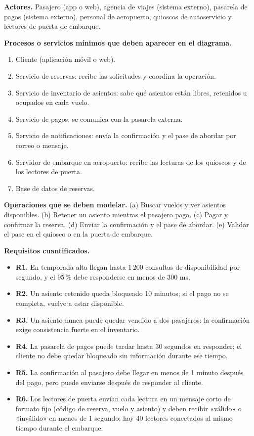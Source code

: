 \documentclass[10pt]{article}
\begin{document}
\textbf{Actores.} Pasajero (app o web), agencia de viajes (sistema externo), pasarela de pagos (sistema externo), personal de aeropuerto, quioscos de autoservicio y lectores de puerta de embarque.

\textbf{Procesos o servicios mínimos que deben aparecer en el diagrama.}
\begin{enumerate}[leftmargin=1.6em]
	\item Cliente (aplicación móvil o web).
	\item Servicio de reservas: recibe las solicitudes y coordina la operación.
	\item Servicio de inventario de asientos: sabe qué asientos están libres, retenidos u ocupados en cada vuelo.
	\item Servicio de pagos: se comunica con la pasarela externa.
	\item Servicio de notificaciones: envía la confirmación y el pase de abordar por correo o mensaje.
	\item Servidor de embarque en aeropuerto: recibe las lecturas de los quioscos y de los lectores de puerta.
	\item Base de datos de reservas.
\end{enumerate}

\textbf{Operaciones que se deben modelar.} (a) Buscar vuelos y ver asientos disponibles. (b) Retener un asiento mientras el pasajero paga. (c) Pagar y confirmar la reserva. (d) Enviar la confirmación y el pase de abordar. (e) Validar el pase en el quiosco o en la puerta de embarque.

\textbf{Requisitos cuantificados.}
\begin{itemize}[leftmargin=1.6em]
	\item \textbf{R1.} En temporada alta llegan hasta 1\,200 consultas de disponibilidad por segundo, y el 95\,\% debe responderse en menos de 300 ms.
	\item \textbf{R2.} Un asiento retenido queda bloqueado 10 minutos; si el pago no se completa, vuelve a estar disponible.
	\item \textbf{R3.} Un asiento nunca puede quedar vendido a dos pasajeros: la confirmación exige consistencia fuerte en el inventario.
	\item \textbf{R4.} La pasarela de pagos puede tardar hasta 30 segundos en responder; el cliente no debe quedar bloqueado sin información durante ese tiempo.
	\item \textbf{R5.} La confirmación al pasajero debe llegar en menos de 1 minuto después del pago, pero puede enviarse después de responder al cliente.
	\item \textbf{R6.} Los lectores de puerta envían cada lectura en un mensaje corto de formato fijo (código de reserva, vuelo y asiento) y deben recibir «válido» o «inválido» en menos de 1 segundo; hay 40 lectores conectados al mismo tiempo durante el embarque.
\end{itemize}
\end{document}
